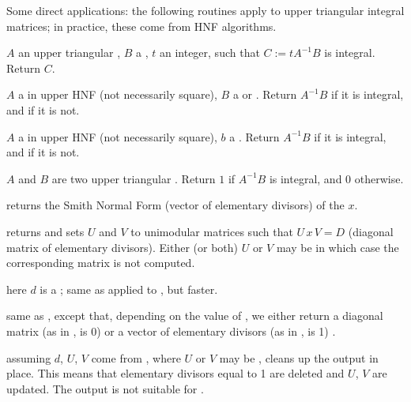 Some direct applications: the following routines apply to upper triangular
integral matrices; in practice, these come from HNF algorithms.

 $A$ an upper triangular ,
$B$ a , $t$ an integer, such that $C := tA^{-1}B$ is integral.
Return $C$.

 $A$ a  in upper HNF (not
necessarily square), $B$ a  or . Return $A^{-1}B$ if it is
integral, and  if it is not.

 $A$ a  in upper HNF
(not necessarily square), $b$ a .  Return $A^{-1}B$ if it is
integral, and  if it is not.

 $A$ and $B$ are two upper triangular
. Return $1$ if $A^{-1} B$ is integral, and $0$ otherwise.


 returns the Smith Normal Form (vector of
elementary divisors) of the  $x$.

 returns
 and sets $U$ and $V$ to unimodular matrices such that $U\,
x\, V = D$ (diagonal matrix of elementary divisors). Either (or both) $U$ or
$V$ may be  in which case the corresponding matrix is not computed.

 here $d$ is a ; same as
 applied to , but faster.

 same as
, except that, depending on the value of , we
either return a diagonal matrix (as in ,  is 0)
or a vector of elementary divisors (as in ,  is 1) .

 assuming $d$, $U$, $V$ come
from , where $U$ or $V$ may be ,
cleans up the output in place. This means that elementary divisors equal to 1
are deleted and $U$, $V$ are updated. The output is not suitable for
.

